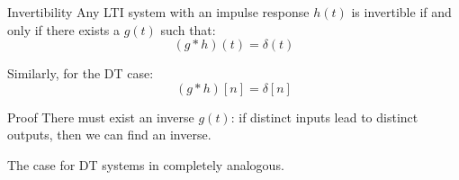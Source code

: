 \documentclass[a4paper]{article}
\begin{document}
\begin{parag}{Invertibility}
    Any LTI system with an impulse response $h\left(t\right)$ is invertible if and only if there exists a $g\left(t\right)$ such that: 
    \[\left(g * h\right)\left(t\right) = \delta\left(t\right)\]

    Similarly, for the DT case: 
    \[\left(g * h\right)\left[n\right] = \delta \left[n\right]\]

    \begin{subparag}{Proof}
        There must exist an inverse $g\left(t\right)$: if distinct inputs lead to distinct outputs, then we can find an inverse.

        The case for DT systems in completely analogous.
    \end{subparag}
\end{parag}
\end{document}
